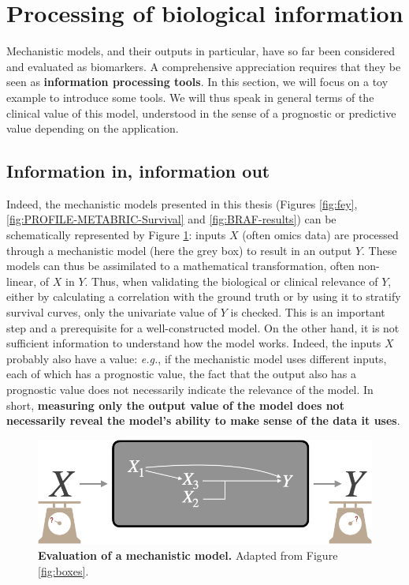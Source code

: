 \documentclass[a4paper,12pt,twoside,onecolumn,openright,final,oldfontcommands]{memoir}
\begin{document}
\section{Processing of biological
information}\label{processing-of-biological-information}

Mechanistic models, and their outputs in particular, have so far been
considered and evaluated as biomarkers. A comprehensive appreciation
requires that they be seen as \textbf{information processing tools}. In
this section, we will focus on a toy example to introduce some tools. We
will thus speak in general terms of the clinical value of this model,
understood in the sense of a prognostic or predictive value depending on
the application.

\subsection{Information in, information
out}\label{information-in-information-out}

Indeed, the mechanistic models presented in this thesis (Figures
\ref{fig:fey}, \ref{fig:PROFILE-METABRIC-Survival} and
\ref{fig:BRAF-results}) can be schematically represented by Figure
\ref{fig:box-mech}: inputs \(X\) (often omics data) are processed
through a mechanistic model (here the grey box) to result in an output
\(Y\). These models can thus be assimilated to a mathematical
transformation, often non-linear, of \(X\) in \(Y\). Thus, when
validating the biological or clinical relevance of \(Y\), either by
calculating a correlation with the ground truth or by using it to
stratify survival curves, only the univariate value of \(Y\) is checked.
This is an important step and a prerequisite for a well-constructed
model. On the other hand, it is not sufficient information to understand
how the model works. Indeed, the inputs \(X\) probably also have a
value: \emph{e.g.}, if the mechanistic model uses different inputs, each
of which has a prognostic value, the fact that the output also has a
prognostic value does not necessarily indicate the relevance of the
model. In short, \textbf{measuring only the output value of the model
does not necessarily reveal the model's ability to make sense of the
data it uses}.

\begin{figure}

{\centering \includegraphics[width=0.8\linewidth]{fig/box-mech} 

}

\caption[Evaluation of a mechanistic model]{\textbf{Evaluation of a mechanistic model.}
Adapted from Figure \ref{fig:boxes}.}\label{fig:box-mech}
\end{figure}
\end{document}
